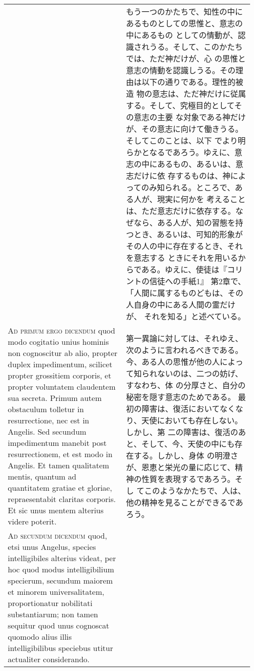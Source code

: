\documentclass[10pt]{jsarticle} %
\begin{document}
\begin{longtable}{p{21em}p{21em}}
 
&

もう一つのかたちで、知性の中にあるものとしての思惟と、意志の中にあるもの
 としての情動が、認識されうる。そして、このかたちでは、ただ神だけが、心
 の思惟と意志の情動を認識しうる。その理由は以下の通りである。理性的被造
 物の意志は、ただ神だけに従属する。そして、究極目的としてその意志の主要
 な対象である神だけが、その意志に向けて働きうる。そしてこのことは、以下
 でより明らかとなるであろう。ゆえに、意志の中にあるもの、あるいは、意志だけに依
 存するものは、神によってのみ知られる。ところで、ある人が、現実に何かを
 考えることは、ただ意志だけに依存する。なぜなら、ある人が、知の習態を持
 つとき、あるいは、可知的形象がその人の中に存在するとき、それを意志する
 ときにそれを用いるからである。ゆえに、使徒は『コリントの信徒への手紙1』
 第2章で、「人間に属するものどもは、その人自身の中にある人間の霊だけが、
 それを知る」と述べている。

\\



{\scshape Ad primum ergo dicendum} quod modo cogitatio
 unius hominis non cognoscitur ab alio, propter duplex impedimentum,
 scilicet propter grossitiem corporis, et propter voluntatem claudentem
 sua secreta. Primum autem obstaculum tolletur in resurrectione, nec est
 in Angelis. Sed secundum impedimentum manebit post resurrectionem, et
 est modo in Angelis. Et tamen qualitatem mentis, quantum ad quantitatem
 gratiae et gloriae, repraesentabit claritas corporis. Et sic unus
 mentem alterius videre poterit.

 
&


第一異論に対しては、それゆえ、次のように言われるべきである。
今、ある人の思惟が他の人によって知られないのは、二つの妨げ、すなわち、体
 の分厚さと、自分の秘密を隠す意志のためである。
最初の障害は、復活においてなくなり、天使においても存在しない。しかし、第
 二の障害は、復活のあと、そして、今、天使の中にも存在する。しかし、身体
 の明澄さが、恩恵と栄光の量に応じて、精神の性質を表現するであろう。そし
 てこのようなかたちで、人は、他の精神を見ることができるであろう。

\\



{\scshape Ad secundum dicendum} quod, etsi unus Angelus,
 species intelligibiles alterius videat, per hoc quod modus
 intelligibilium specierum, secundum maiorem et minorem universalitatem,
 proportionatur nobilitati substantiarum; non tamen sequitur quod unus
 cognoscat quomodo alius illis intelligibilibus speciebus utitur
 actualiter considerando.
 

\end{longtable}
\end{document}
